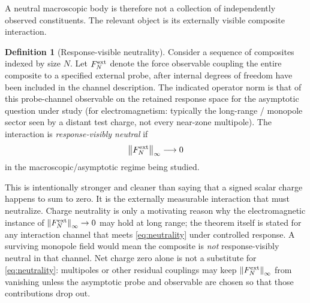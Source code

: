 \documentclass[11pt]{article}
\theoremstyle{definition}
\newtheorem{definition}[theorem]{Definition}
\theoremstyle{remark}
\newcommand{\norm}[1]{\left\lVert #1\right\rVert}
\begin{document}
A neutral macroscopic body is therefore not a collection of independently observed constituents.
The relevant object is its externally visible composite interaction.

\begin{definition}[Response-visible neutrality]
Consider a sequence of composites indexed by size $N$.  Let $F_N^{\rm ext}$ denote the force observable coupling the entire composite to a specified external probe, after internal degrees of freedom have been included in the channel description.
The indicated operator norm is that of this probe-channel observable on the retained response space for the asymptotic question under study (for electromagnetism: typically the long-range / monopole sector seen by a distant test charge, not every near-zone multipole).
The interaction is \emph{response-visibly neutral} if
\begin{equation}
 \norm{F_N^{\rm ext}}_\infty\longrightarrow0
 \label{eq:neutrality}
\end{equation}
in the macroscopic/asymptotic regime being studied.
\end{definition}

This is intentionally stronger and cleaner than saying that a signed scalar charge happens to sum to zero.  It is the externally measurable interaction that must neutralize.
Charge neutrality is only a motivating reason why the electromagnetic instance of $\norm{F_N^{\rm ext}}_\infty\to0$ may hold at long range; the theorem itself is stated for any interaction channel that meets \eqref{eq:neutrality} under controlled response.
A surviving monopole field would mean the composite is \emph{not} response-visibly neutral in that channel.
Net charge zero alone is not a substitute for \eqref{eq:neutrality}: multipoles or other residual couplings may keep $\norm{F_N^{\rm ext}}_\infty$ from vanishing unless the asymptotic probe and observable are chosen so that those contributions drop out.
\end{document}
